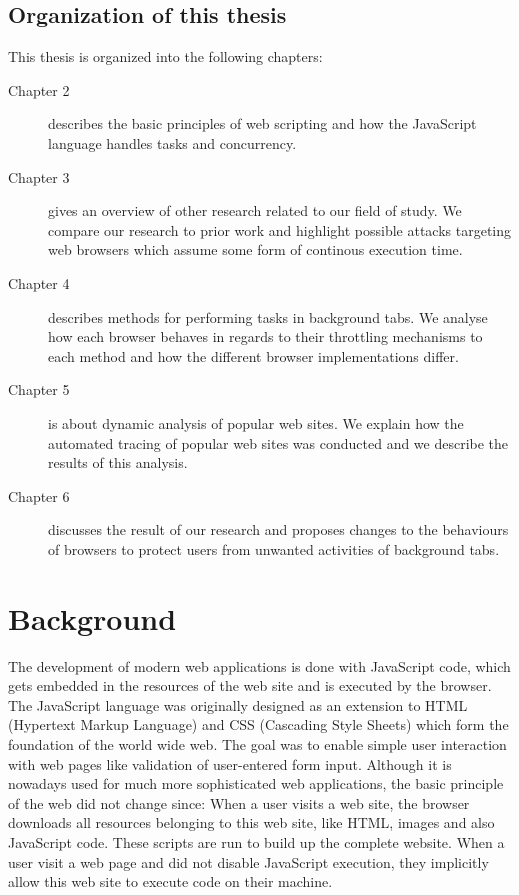 \documentclass[
	ruledheaders=section,%
	class=report,%
	thesis={type=bachelor},%
	accentcolor=9c,%
	custommargins=true,%
	marginpar=false,%
	parskip=half-,%
	fontsize=11pt,%
]{tudapub}
\begin{document}
  \section{Organization of this thesis}

  This thesis is organized into the following chapters:

  \begin{description}
  \item[Chapter 2] describes the basic principles of web scripting and how the JavaScript language handles tasks and concurrency.
    
  \item[Chapter 3] gives an overview of other research related to our field of study. We compare our research to prior work and highlight possible attacks targeting web browsers which assume some form of continous execution time.
    
  \item[Chapter 4] describes methods for performing tasks in background tabs. We analyse how each browser behaves in regards to their throttling mechanisms to each method and how the different browser implementations differ.
    
  \item[Chapter 5] is about dynamic analysis of popular web sites. We explain how the automated tracing of popular web sites was conducted and we describe the results of this analysis.
    
  \item[Chapter 6] discusses the result of our research and proposes changes to the behaviours of browsers to protect users from unwanted activities of background tabs.
  \end{description} 

  
  \newpage
  \chapter{Background}
  
  The development of modern web applications is done with JavaScript code, which gets embedded in the resources of the web site and is executed by the browser. The JavaScript language was originally designed as an extension to HTML (Hypertext Markup Language) and CSS (Cascading Style Sheets) which form the foundation of the world wide web. The goal was to enable simple user interaction with web pages like validation of user-entered form input. Although it is nowadays used for much more sophisticated web applications, the basic principle of the web did not change since: When a user visits a web site, the browser downloads all resources belonging to this web site, like HTML, images and also JavaScript code. These scripts are run to build up the complete website. When a user visit a web page and did not disable JavaScript execution, they implicitly allow this web site to execute code on their machine.
\end{document}
